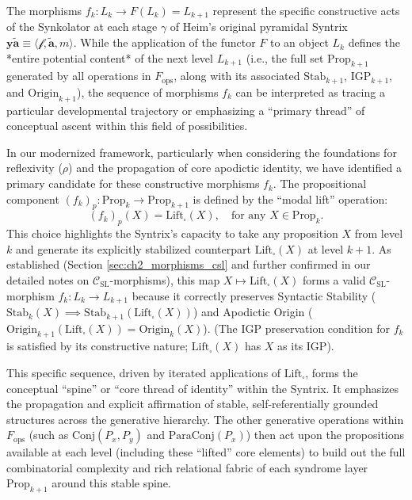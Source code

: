 \documentclass[
    12pt,              %
    a4paper,           %
    headings=normal,   %
    twoside=true,      %
    BCOR=8mm,          %
]{scrbook}
\newcommand{\q}[1]{\enquote{#1}}
\newcommand{\syntrix}{\bm{y\widetilde{a}}}
\newcommand{\metrophor}{\bm{\widetilde{a}}}
\newcommand{\synkolator}{\mathcal{f}}
\newcommand{\synkolationsstufe}{m}
\newcommand{\BoxSyn}{\square}
\newcommand{\fops}{F_{\text{ops}}}
\begin{document}
The morphisms \(f_k: L_k \to F(L_k) = L_{k+1}\) represent the specific constructive acts of the Synkolator at each stage \(\gamma\) of Heim's original pyramidal Syntrix \( \syntrix \equiv \langle \synkolator, \metrophor, \synkolationsstufe \rangle \). While the application of the functor \(F\) to an object \(L_k\) defines the *entire potential content* of the next level \(L_{k+1}\) (i.e., the full set \(\text{Prop}_{k+1}\) generated by all operations in \(\fops\), along with its associated \(\text{Stab}_{k+1}\), \(\text{IGP}_{k+1}\), and \(\text{Origin}_{k+1}\)), the sequence of morphisms \(f_k\) can be interpreted as tracing a particular developmental trajectory or emphasizing a \q{primary thread} of conceptual ascent within this field of possibilities.

In our modernized framework, particularly when considering the foundations for reflexivity (\(\rho\)) and the propagation of core apodictic identity, we have identified a primary candidate for these constructive morphisms \(f_k\). The propositional component \((f_k)_p: \text{Prop}_k \to \text{Prop}_{k+1}\) is defined by the \q{modal lift} operation:
\[ (f_k)_p(X) = \text{Lift}_\BoxSyn(X), \quad \text{for any } X \in \text{Prop}_k. \]
This choice highlights the Syntrix's capacity to take any proposition \(X\) from level \(k\) and generate its explicitly stabilized counterpart \(\text{Lift}_\BoxSyn(X)\) at level \(k+1\). As established (Section \ref{sec:ch2_morphisms_csl} and further confirmed in our detailed notes on \(\mathcal{C}_{\text{SL}}\)-morphisms), this map \(X \mapsto \text{Lift}_\BoxSyn(X)\) forms a valid \(\mathcal{C}_{\text{SL}}\)-morphism \(f_k: L_k \to L_{k+1}\) because it correctly preserves Syntactic Stability (\(\text{Stab}_k(X) \implies \text{Stab}_{k+1}(\text{Lift}_\BoxSyn(X))\)) and Apodictic Origin (\(\text{Origin}_{k+1}(\text{Lift}_\BoxSyn(X)) = \text{Origin}_k(X)\)). (The IGP preservation condition for \(f_k\) is satisfied by its constructive nature; \(\text{Lift}_\BoxSyn(X)\) has \(X\) as its IGP).

This specific sequence, driven by iterated applications of \(\text{Lift}_\BoxSyn\), forms the conceptual \q{spine} or \q{core thread of identity} within the Syntrix. It emphasizes the propagation and explicit affirmation of stable, self-referentially grounded structures across the generative hierarchy. The other generative operations within \(\fops\) (such as \(\text{Conj}(P_x, P_y)\) and \(\text{ParaConj}(P_x)\)) then act upon the propositions available at each level (including these \q{lifted} core elements) to build out the full combinatorial complexity and rich relational fabric of each syndrome layer \(\text{Prop}_{k+1}\) around this stable spine.
\end{document}
